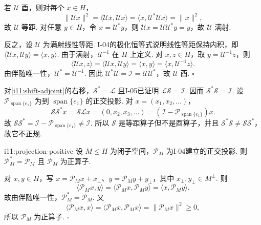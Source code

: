 \begin{FAProof}
若 \(\displaystyle \mathcal U\) 酉，则对每个 \(\displaystyle x\in H\)，
\[
\|\mathcal Ux\|^2
=\langle\mathcal Ux,\mathcal Ux\rangle
=\langle x,\mathcal U^*\mathcal Ux\rangle
=\|x\|^2,
\]
故 \(\displaystyle \mathcal U\) 等距. 对任意 \(\displaystyle y\in H\)，令 \(\displaystyle x=\mathcal U^*y\)，则 \(\displaystyle \mathcal Ux=\mathcal U\mathcal U^*y=y\)，故 \(\displaystyle \mathcal U\) 满射.

反之，设 \(\displaystyle \mathcal U\) 为满射线性等距. I-04的极化恒等式说明线性等距保持内积，即 \(\displaystyle \langle\mathcal Ux,\mathcal Uy\rangle=\langle x,y\rangle\). 由于满射，\(\displaystyle \mathcal U^{-1}\) 在 \(\displaystyle H\) 上定义. 对 \(\displaystyle x,z\in H\)，取 \(\displaystyle y=\mathcal U^{-1}z\)，则
\[
\langle\mathcal Ux,z\rangle
=\langle\mathcal Ux,\mathcal Uy\rangle
=\langle x,y\rangle
=\langle x,\mathcal U^{-1}z\rangle.
\]
由伴随唯一性，\(\displaystyle \mathcal U^*=\mathcal U^{-1}\). 因此 \(\displaystyle \mathcal U^*\mathcal U=\mathcal I=\mathcal U\mathcal U^*\)，故 \(\displaystyle \mathcal U\) 酉.
\hfill\(\square\)
\end{FAProof}

\begin{FAExample}[等距但非酉且非正规]
对\autoref{i11:shift-adjoint}的右移，\(\displaystyle \mathcal S^*=\mathcal L\) 且I-05已证明 \(\displaystyle \mathcal L\mathcal S=\mathcal I\). 因而
\(\displaystyle \mathcal S^*\mathcal S=\mathcal I\).
设 \(\displaystyle \mathcal P_{\operatorname{span}\{e_1\}}\) 为到 \(\displaystyle \operatorname{span}\{e_1\}\) 的正交投影. 对 \(\displaystyle x=(x_1,x_2,\dots)\)，
\[
\mathcal S\mathcal S^*x
=\mathcal S\mathcal Lx
=(0,x_2,x_3,\dots)
=(\mathcal I-\mathcal P_{\operatorname{span}\{e_1\}})x.
\]
故
\(\displaystyle \mathcal S\mathcal S^* =\mathcal I-\mathcal P_{\operatorname{span}\{e_1\}} \neq\mathcal I\).
所以 \(\displaystyle \mathcal S\) 是等距算子但不是酉算子，并且 \(\displaystyle \mathcal S^*\mathcal S\neq\mathcal S\mathcal S^*\)，故它不正规.
\end{FAExample}

\begin{FAProposition}[B][正交投影自伴且为正]{i11:projection-positive}
设 \(\displaystyle M\leqslant H\) 为闭子空间，\(\displaystyle \mathcal P_M\) 为I-04建立的正交投影. 则
\(\displaystyle \mathcal P_M^*=\mathcal P_M\)
且 \(\displaystyle \mathcal P_M\) 为正算子.
\end{FAProposition}

\begin{FAProof}
对 \(\displaystyle x,y\in H\)，写 \(\displaystyle x=\mathcal P_Mx+x_\perp\)、\(\displaystyle y=\mathcal P_My+y_\perp\)，其中 \(\displaystyle x_\perp,y_\perp\in M^\perp\). 则
\[
\langle\mathcal P_Mx,y\rangle
=\langle\mathcal P_Mx,\mathcal P_My\rangle
=\langle x,\mathcal P_My\rangle.
\]
故由伴随唯一性，\(\displaystyle \mathcal P_M^*=\mathcal P_M\). 又
\[
\langle\mathcal P_Mx,x\rangle
=\langle\mathcal P_Mx,\mathcal P_Mx\rangle
=\|\mathcal P_Mx\|^2
\geqslant0,
\]
所以 \(\displaystyle \mathcal P_M\) 为正算子.
\hfill\(\square\)
\end{FAProof}

